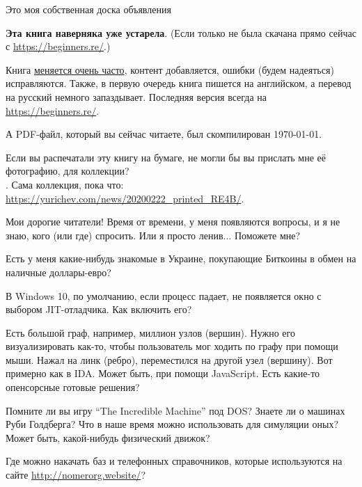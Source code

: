 
\begin{center}
\LARGE{} Это моя собственная доска объявления \normalsize{}
\end{center}

\textbf{Эта книга наверняка уже устарела}.
(Если только не была скачана прямо сейчас с \url{https://beginners.re/}.)

Книга \href{\RepoURL/ChangeLog}{меняется очень часто},
контент добавляется, ошибки (будем надеяться) исправляются.
Также, в первую очередь книга пишется на английском, а перевод на русский немного запаздывает.
Последняя версия всегда на \url{https://beginners.re/}.

А PDF-файл, который вы сейчас читаете, был скомпилирован \today{}.

\myhrule{}

Если вы распечатали эту книгу на бумаге, не могли бы вы прислать мне её фотографию, для коллекции?\\
\EMAILS{}.
Сама коллекция, пока что: \url{https://yurichev.com/news/20200222_printed_RE4B/}.

\myhrule{}

Мои дорогие читатели! Время от времени, у меня появляются вопросы, и я не знаю, кого (или где) спросить.
Или я просто ленив...
Поможете мне?

\myhrule{}

Есть у меня какие-нибудь знакомые в Украине, покупающие Биткоины в обмен на наличные доллары-евро?

\myhrule{}

В Windows 10, по умолчанию, если процесс падает, не появляется окно с выбором JIT-отладчика.
Как включить его?

\myhrule{}

Есть большой граф, например, миллион узлов (вершин).
Нужно его визуализировать как-то, чтобы пользователь мог ходить по графу при помощи мыши.
Нажал на линк (ребро), переместился на другой узел (вершину).
Вот примерно как в IDA.
Может быть, при помощи JavaScript.
Есть какие-то опенсорсные готовые решения?

\myhrule{}

Помните ли вы игру ``The Incredible Machine'' под DOS?
Знаете ли о машинах Руби Голдберга?
Что в наше время можно использовать для симуляции оных?
Может быть, какой-нибудь физический движок?

\myhrule{}

Где можно накачать баз и телефонных справочников, которые используются на сайте \url{http://nomerorg.website/}?

